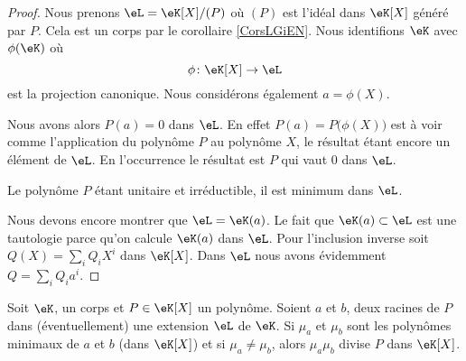 \begin{proof}
    Nous prenons \( \eL=\eK[X]/(P)\) où \( (P)\) est l'idéal dans \( \eK[X]\) généré par \( P\). Cela est un corps par le corollaire \ref{CorsLGiEN}. Nous identifions \( \eK\) avec \( \phi(\eK)\) où
    \begin{equation}
        \phi\colon \eK[X]\to \eL 
    \end{equation}
    est la projection canonique. Nous considérons également \( a=\phi(X)\).

    Nous avons alors \( P(a)=0\) dans \( \eL\). En effet \( P(a)=P\big( \phi(X) \big)\) est à voir comme l'application du polynôme \( P\) au polynôme \( X\), le résultat étant encore un élément de \( \eL\). En l'occurrence le résultat est \( P\) qui vaut \( 0\) dans \( \eL\).

    Le polynôme \( P\) étant unitaire et irréductible, il est minimum dans \( \eL\).

    Nous devons encore montrer que \( \eL=\eK(a)\). Le fait que \( \eK(a)\subset \eL\) est une tautologie parce qu'on calcule \( \eK(a)\) dans \( \eL\). Pour l'inclusion inverse soit \( Q(X)=\sum_iQ_iX^i\) dans \( \eK[X]\). Dans \( \eL\) nous avons évidemment \( Q=\sum_iQ_ia^i\).
\end{proof}

\begin{proposition} \label{PropyMTEbH}
    Soit \( \eK\), un corps et \( P\in \eK[X]\) un polynôme. Soient \( a\) et \( b\), deux racines de \( P\) dans (éventuellement) une extension \( \eL\) de \( \eK\). Si \( \mu_a\) et \( \mu_b\) sont les polynômes minimaux de \( a\) et \( b\) (dans \( \eK[X]\)) et si \( \mu_a\neq \mu_b\), alors \( \mu_a\mu_b\) divise \( P\) dans \( \eK[X]\).
\end{proposition}

